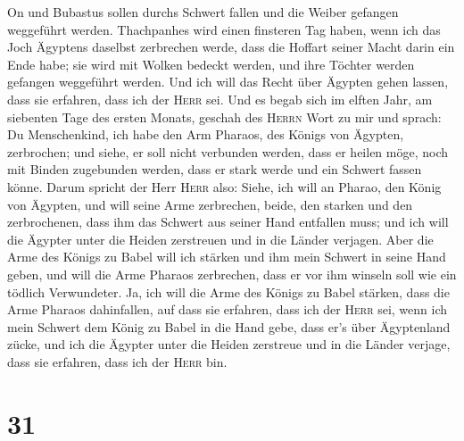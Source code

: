 On und Bubastus sollen durchs Schwert fallen und die Weiber gefangen
weggeführt werden.  Thachpanhes wird einen finsteren Tag
haben, wenn ich das Joch Ägyptens daselbst zerbrechen werde, dass die
Hoffart seiner Macht darin ein Ende habe; sie wird mit Wolken bedeckt
werden, und ihre Töchter werden gefangen weggeführt werden.
 Und ich will das Recht über Ägypten gehen lassen, dass
sie erfahren, dass ich der \textsc{Herr} sei.  Und es
begab sich im elften Jahr, am siebenten Tage des ersten Monats, geschah
des \textsc{Herrn} Wort zu mir und sprach:  Du
Menschenkind, ich habe den Arm Pharaos, des Königs von Ägypten,
zerbrochen; und siehe, er soll nicht verbunden werden, dass er heilen
möge, noch mit Binden zugebunden werden, dass er stark werde und ein
Schwert fassen könne.  Darum spricht der Herr
\textsc{Herr} also: Siehe, ich will an Pharao, den König von Ägypten,
und will seine Arme zerbrechen, beide, den starken und den zerbrochenen,
dass ihm das Schwert aus seiner Hand entfallen muss;  und
ich will die Ägypter unter die Heiden zerstreuen und in die Länder
verjagen.  Aber die Arme des Königs zu Babel will ich
stärken und ihm mein Schwert in seine Hand geben, und will die Arme
Pharaos zerbrechen, dass er vor ihm winseln soll wie ein tödlich
Verwundeter.  Ja, ich will die Arme des Königs zu Babel
stärken, dass die Arme Pharaos dahinfallen, auf dass sie erfahren, dass
ich der \textsc{Herr} sei, wenn ich mein Schwert dem König zu Babel in
die Hand gebe, dass er's über Ägyptenland zücke,  und ich
die Ägypter unter die Heiden zerstreue und in die Länder verjage, dass
sie erfahren, dass ich der \textsc{Herr} bin.

\hypertarget{section-30}{%
\section{31}\label{section-30}}

